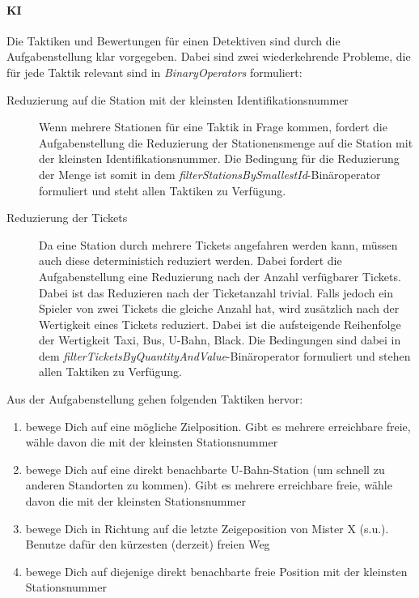                 \paragraph{KI}
                    Die Taktiken und Bewertungen für einen Detektiven sind durch die Aufgabenstellung klar vorgegeben.
                    Dabei sind zwei wiederkehrende Probleme, die für jede Taktik relevant sind in \textit{BinaryOperators} formuliert:
                    \begin{description}
                        \item[Reduzierung auf die Station mit der kleinsten Identifikationsnummer]
                        Wenn mehrere Stationen für eine Taktik in Frage kommen, fordert die Aufgabenstellung die Reduzierung der Stationensmenge
                        auf die Station mit der kleinsten Identifikationsnummer.
                        Die Bedingung für die Reduzierung der Menge ist somit in dem \textit{filterStationsBySmallestId}-Binäroperator formuliert
                        und steht allen Taktiken zu Verfügung.
                        \item[Reduzierung der Tickets]
                        Da eine Station durch mehrere Tickets angefahren werden kann, müssen auch diese deterministich reduziert werden.
                        Dabei fordert die Aufgabenstellung eine Reduzierung nach der Anzahl verfügbarer Tickets. Dabei ist das Reduzieren
                        nach der Ticketanzahl trivial. Falls jedoch ein Spieler von zwei Tickets die gleiche Anzahl hat, wird zusätzlich
                        nach der Wertigkeit eines Tickets reduziert. Dabei ist die aufsteigende Reihenfolge der Wertigkeit
                        Taxi, Bus, U-Bahn, Black.
                        \newline
                        Die Bedingungen sind dabei in dem \textit{filterTicketsByQuantityAndValue}-Binäroperator formuliert und stehen allen Taktiken zu Verfügung.
                    \end{description}
                    Aus der Aufgabenstellung gehen folgenden Taktiken hervor:
                    \begin{enumerate}
                        \item bewege Dich auf eine mögliche Zielposition. Gibt es mehrere erreichbare freie, wähle davon die mit der kleinsten Stationsnummer
                        \item bewege Dich auf eine direkt benachbarte U-Bahn-Station (um schnell zu anderen Standorten zu kommen). Gibt es mehrere erreichbare freie, wähle davon die mit der kleinsten Stationsnummer
                        \item bewege Dich in Richtung auf die letzte Zeigeposition von Mister X (s.u.). Benutze dafür den kürzesten (derzeit) freien Weg
                        \item bewege Dich auf diejenige direkt benachbarte freie Position mit der kleinsten Stationsnummer 
                    \end{enumerate}
